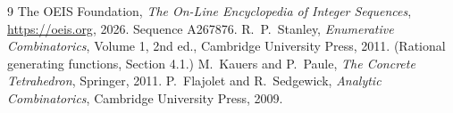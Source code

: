 \documentclass[11pt,a4paper]{article}
\theoremstyle{plain}
\theoremstyle{definition}
\begin{document}
\begin{thebibliography}{9}
 The OEIS Foundation, \emph{The On-Line Encyclopedia of Integer
Sequences}, \url{https://oeis.org}, 2026. Sequence A267876.
 R.~P.~Stanley, \emph{Enumerative Combinatorics}, Volume 1, 2nd ed.,
Cambridge University Press, 2011. (Rational generating functions, Section 4.1.)
 M.~Kauers and P.~Paule, \emph{The Concrete Tetrahedron}, Springer, 2011.
 P.~Flajolet and R.~Sedgewick, \emph{Analytic Combinatorics}, Cambridge
University Press, 2009.
\end{thebibliography}
\end{document}
